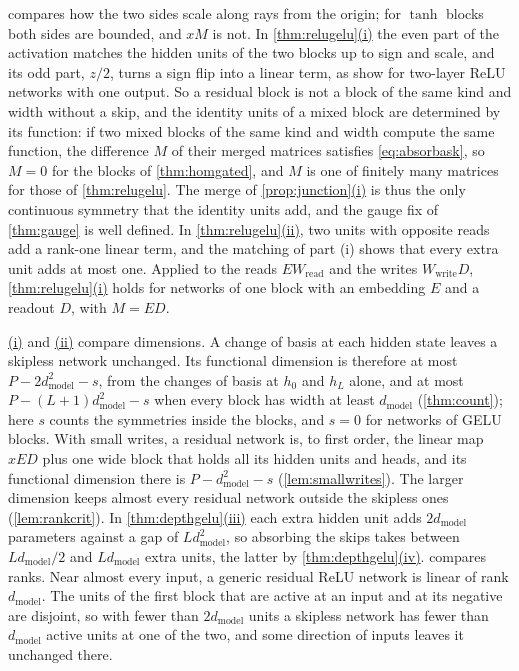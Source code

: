 \documentclass[10pt]{article}
\theoremstyle{definition}
\theoremstyle{remark}
\newcommand{\Wread}{W_{\mathrm{read}}}
\newcommand{\Wwrite}{W_{\mathrm{write}}}
\newcommand{\dm}{d_{\mathrm{model}}}
\DeclareRobustCommand{\cpref}[2]{\hyperref[#1:#2]{\cref*{#1}(#2)}}
\DeclareRobustCommand{\Cpref}[2]{\hyperref[#1:#2]{\Cref*{#1}(#2)}}
\DeclareRobustCommand{\ptlink}[2]{\hyperref[#1:#2]{(#2)}}
\begin{document}
 compares how the two sides scale along rays from the origin; for $\tanh$ blocks both sides are bounded, and $xM$ is not. In \cpref{thm:relugelu}{i} the even part of the activation matches the hidden units of the two blocks up to sign and scale, and its odd part, $z/2$, turns a sign flip into a linear term, as \citet[Section~3]{petzka2020symmetries} show for two-layer ReLU networks with one output. So a residual block is not a block of the same kind and width without a skip, and the identity units of a mixed block are determined by its function: if two mixed blocks of the same kind and width compute the same function, the difference $M$ of their merged matrices satisfies \eqref{eq:absorbask}, so $M = 0$ for the blocks of \cref{thm:homgated}, and $M$ is one of finitely many matrices for those of \cref{thm:relugelu}. The merge of \cpref{prop:junction}{i} is thus the only continuous symmetry that the identity units add, and the gauge fix of \cref{thm:gauge} is well defined. In \cpref{thm:relugelu}{ii}, two units with opposite reads add a rank-one linear term, and the matching of part (i) shows that every extra unit adds at most one. Applied to the reads $E\Wread$ and the writes $\Wwrite D$, \cpref{thm:relugelu}{i} holds for networks of one block with an embedding $E$ and a readout $D$, with $M = ED$.

\Cpref{thm:depthgelu}{i} and \ptlink{thm:depthgelu}{ii} compare dimensions. A change of basis at each hidden state leaves a skipless network unchanged. Its functional dimension is therefore at most $P - 2\dm^2 - s$, from the changes of basis at $h_0$ and $h_L$ alone, and at most $P - (L+1)\dm^2 - s$ when every block has width at least $\dm$ (\cref{thm:count}); here $s$ counts the symmetries inside the blocks, and $s = 0$ for networks of GELU blocks. With small writes, a residual network is, to first order, the linear map $xED$ plus one wide block that holds all its hidden units and heads, and its functional dimension there is $P - \dm^2 - s$ (\cref{lem:smallwrites}). The larger dimension keeps almost every residual network outside the skipless ones (\cref{lem:rankcrit}). In \cpref{thm:depthgelu}{iii} each extra hidden unit adds $2\dm$ parameters against a gap of $L\dm^2$, so absorbing the skips takes between $L\dm/2$ and $L\dm$ extra units, the latter by \cpref{thm:depthgelu}{iv}.  compares ranks. Near almost every input, a generic residual ReLU network is linear of rank $\dm$. The units of the first block that are active at an input and at its negative are disjoint, so with fewer than $2\dm$ units a skipless network has fewer than $\dm$ active units at one of the two, and some direction of inputs leaves it unchanged there.
\end{document}
